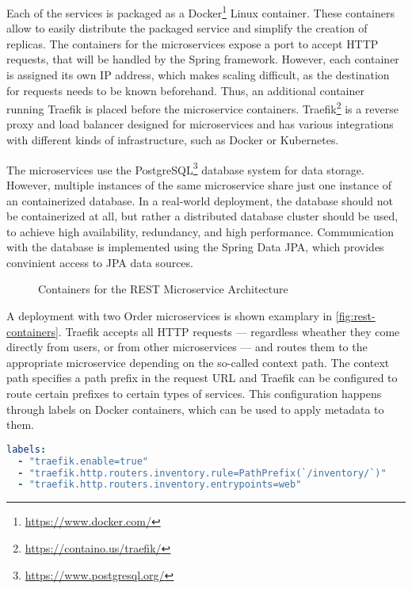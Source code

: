Each of the services is packaged as a Docker\footnote{\url{https://www.docker.com/}} Linux container.
These containers allow to easily distribute the packaged service and simplify the creation of replicas.
The containers for the microservices expose a port to accept \ac{HTTP} requests, that will be handled by the Spring framework.
However, each container is assigned its own IP address, which makes scaling difficult, as the destination for requests needs to be known beforehand.
Thus, an additional container running Traefik is placed before the microservice containers.
Traefik\footnote{\url{https://containo.us/traefik/}} is a reverse proxy and load balancer designed for microservices and has various integrations with different kinds of infrastructure, such as Docker or Kubernetes.

The microservices use the PostgreSQL\footnote{\url{https://www.postgresql.org/}} database system for data storage.
However, multiple instances of the same microservice share just one instance of an containerized database.
In a real-world deployment, the database should not be containerized at all, but rather a distributed database cluster should be used, to achieve high availability, redundancy, and high performance.
Communication with the database is implemented using the Spring Data \acs{JPA}, which provides convinient access to \ac{JPA} data sources.

\begin{figure}[!htb]
    \centering
    
    \caption{Containers for the \acs{REST} Microservice Architecture}
    \label{fig:rest-containers}
\end{figure}

A deployment with two Order microservices is shown examplary in \autoref{fig:rest-containers}.
Traefik accepts all \ac{HTTP} requests --- regardless wheather they come directly from users, or from other microservices --- and routes them to the appropriate microservice depending on the so-called context path.
The context path specifies a path prefix in the request \ac{URL} and Traefik can be configured to route certain prefixes to certain types of services.
This configuration happens through labels on Docker containers, which can be used to apply metadata to them.


\begin{lstlisting}[caption={Traefik Configuration for the Inventory Service}, showlines=true, label=lst:traefik-docker, language=yaml]
labels:
  - "traefik.enable=true"
  - "traefik.http.routers.inventory.rule=PathPrefix(`/inventory/`)"
  - "traefik.http.routers.inventory.entrypoints=web"
\end{lstlisting}

